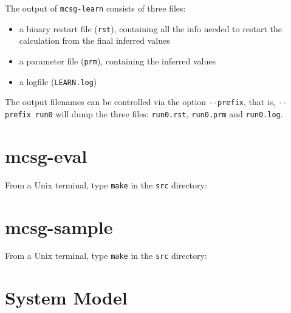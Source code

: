 \documentclass[a4paper,onecolumn]{article}
\begin{document}
The output of \verb|mcsg-learn| consists of three files:
\begin{itemize}
\item a binary restart file (\verb|rst|), containing all the info needed to restart the calculation from the final inferred values
\item a parameter file (\verb|prm|), containing the inferred values
\item a logfile (\verb|LEARN.log|)
\end{itemize}
The output filenames can be controlled via the option \verb|--prefix|, that is, \verb|--prefix run0| will dump the three files:
\verb|run0.rst|, \verb|run0.prm| and \verb|run0.log|. 


\section{mcsg-eval}
\label{sec:mcsg-eval}
From a Unix terminal, type \verb|make| in the \verb|src| directory:

\section{mcsg-sample}
\label{sec:mcsg-sample}
From a Unix terminal, type \verb|make| in the \verb|src| directory:

\section{System Model}
\label{sec:system-model}


\end{document}
